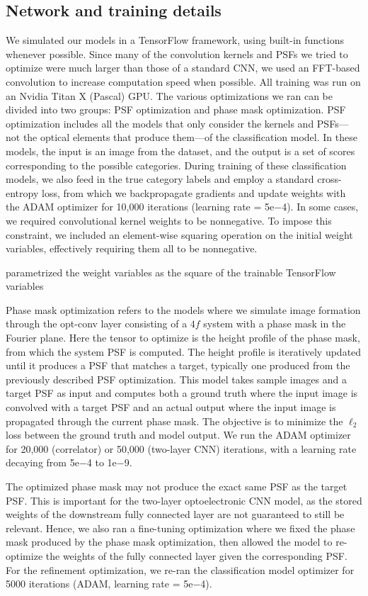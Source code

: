 \documentclass[fleqn,10pt]{wlscirep}
\begin{document}
\subsection*{Network and training details}
We simulated our models in a TensorFlow framework, using built-in functions whenever possible. Since many of the convolution kernels and PSFs we tried to optimize were much larger than those of a standard CNN, we used an FFT-based convolution to increase computation speed when possible. All training was run on an Nvidia Titan X (Pascal) GPU. The various optimizations we ran can be divided into two groups: PSF optimization and phase mask optimization. PSF optimization includes all the models that only consider the kernels and PSFs---not the optical elements that produce them---of the classification model. In these models, the input is an image from the dataset, and the output is a set of scores corresponding to the possible categories. During training of these classification models, we also feed in the true category labels and employ a standard cross-entropy loss, from which we backpropagate gradients and update weights with the ADAM optimizer for 10,000 iterations (learning rate = 5e$-$4). In some cases, we required convolutional kernel weights to be nonnegative. To impose this constraint, we included an element-wise squaring operation on the initial weight variables, effectively requiring them all to be nonnegative. 

parametrized the weight variables as the square of the trainable TensorFlow variables

Phase mask optimization refers to the models where we simulate image formation through the opt-conv layer consisting of a $4f$ system with a phase mask in the Fourier plane. Here the tensor to optimize is the height profile of the phase mask, from which the system PSF is computed. The height profile is iteratively updated until it produces a PSF that matches a target, typically one produced from the previously described PSF optimization. This model takes sample images and a target PSF as input and computes both a ground truth where the input image is convolved with a target PSF and an actual output where the input image is propagated through the current phase mask. The objective is to minimize the $\ell_2$ loss between the ground truth and model output. We run the ADAM optimizer for 20,000 (correlator) or 50,000 (two-layer CNN) iterations, with a learning rate decaying from 5e$-$4 to 1e$-$9.

The optimized phase mask may not produce the exact same PSF as the target PSF. This is important for the two-layer optoelectronic CNN model, as the stored weights of the downstream fully connected layer are not guaranteed to still be relevant. Hence, we also ran a fine-tuning optimization where we fixed the phase mask produced by the phase mask optimization, then allowed the model to re-optimize the weights of the fully connected layer given the corresponding PSF. For the refinement optimization, we re-ran the classification model optimizer for 5000 iterations (ADAM, learning rate = 5e$-$4). 
\end{document}
